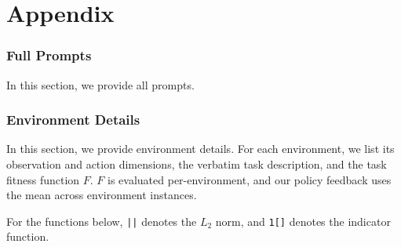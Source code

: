 \appendix
{} %
\part{Appendix} %
\parttoc %

\newpage 
\renewcommand\lstlistingname{Prompt}
\setcounter{lstlisting}{0}

\section{Full Prompts}
\label{appendix:full-prompts}
In this section, we provide all \ourmethod prompts. 







\section{Environment Details}
\label{appendix:environment-details}

In this section, we provide environment details. For each environment, we list its observation and action dimensions, the verbatim task description, and the task fitness function $F$. $F$ is evaluated per-environment, and our policy feedback uses the mean across environment instances.

For the functions below, \verb+||+ denotes the $L_2$ norm, and \verb|1[]| denotes the indicator function.

